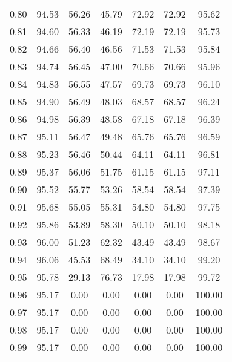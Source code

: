\begin{tabular}{|c|c|c|c|c|c|c|}
      0.80 &     94.53 &     56.26 &      45.79 &   72.92 &      72.92 &         95.62 \\
      0.81 &     94.60 &     56.33 &      46.19 &   72.19 &      72.19 &         95.73 \\
      0.82 &     94.66 &     56.40 &      46.56 &   71.53 &      71.53 &         95.84 \\
      0.83 &     94.74 &     56.45 &      47.00 &   70.66 &      70.66 &         95.96 \\
      0.84 &     94.83 &     56.55 &      47.57 &   69.73 &      69.73 &         96.10 \\
      0.85 &     94.90 &     56.49 &      48.03 &   68.57 &      68.57 &         96.24 \\
      0.86 &     94.98 &     56.39 &      48.58 &   67.18 &      67.18 &         96.39 \\
      0.87 &     95.11 &     56.47 &      49.48 &   65.76 &      65.76 &         96.59 \\
      0.88 &     95.23 &     56.46 &      50.44 &   64.11 &      64.11 &         96.81 \\
      0.89 &     95.37 &     56.06 &      51.75 &   61.15 &      61.15 &         97.11 \\
      0.90 &     95.52 &     55.77 &      53.26 &   58.54 &      58.54 &         97.39 \\
      0.91 &     95.68 &     55.05 &      55.31 &   54.80 &      54.80 &         97.75 \\
      0.92 &     95.86 &     53.89 &      58.30 &   50.10 &      50.10 &         98.18 \\
      0.93 &     96.00 &     51.23 &      62.32 &   43.49 &      43.49 &         98.67 \\
      0.94 &     96.06 &     45.53 &      68.49 &   34.10 &      34.10 &         99.20 \\
      0.95 &     95.78 &     29.13 &      76.73 &   17.98 &      17.98 &         99.72 \\
      0.96 &     95.17 &      0.00 &       0.00 &    0.00 &       0.00 &        100.00 \\
      0.97 &     95.17 &      0.00 &       0.00 &    0.00 &       0.00 &        100.00 \\
      0.98 &     95.17 &      0.00 &       0.00 &    0.00 &       0.00 &        100.00 \\
      0.99 &     95.17 &      0.00 &       0.00 &    0.00 &       0.00 &        100.00 \\
\bottomrule
\end{tabular}
